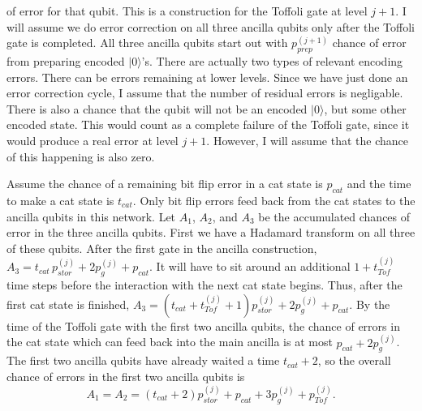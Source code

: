 \documentclass{report}
\newcommand{\ket}[1]{|{#1}\rangle}
\newcommand{\ptj}[1]{p_{Tof}^{({#1})}}
\newcommand{\pgj}[1]{p_g^{({#1})}}
\newcommand{\psj}[1]{p_{stor}^{({#1})}}
\newcommand{\ppj}[1]{p_{prep}^{({#1})}}
\newcommand{\ttj}[1]{t_{Tof}^{({#1})}}
\begin{document}
of error for that qubit.  This is a construction for the Toffoli gate at level 
$j+1$.  I will assume we do error correction on all three ancilla qubits only 
after the Toffoli gate is completed.  All three ancilla qubits start out with 
$\ppj{j+1}$ chance of error from preparing encoded $\ket{0}$'s.  There are 
actually two types of relevant encoding errors.  There can be errors 
remaining at lower levels.  Since we have just done an error correction 
cycle, I assume that the number of residual errors is negligable.  There is 
also a chance that the qubit will not be an encoded $\ket{0}$, but some 
other encoded state.  This would count as a complete failure of the Toffoli 
gate, since it would produce a real error at level $j+1$.  However, I will 
assume that the chance of this happening is also zero.

Assume the chance of a remaining bit flip error in a cat state is $p_{cat}$ 
and the time to make a cat state is $t_{cat}$.  Only bit flip errors feed back 
from the cat states to the ancilla qubits in this network.  Let $A_1$, $A_2$, 
and $A_3$ be the accumulated chances of error in the three ancilla qubits.
First we have a Hadamard transform on all three of these qubits.  After the 
first gate in the ancilla construction, $A_3 = t_{cat}\,\psj{j} + 2 \pgj{j} + p_{cat}$.  It will have to sit around an additional $1 + \ttj{j}$ 
time steps before the interaction with the next cat state begins.  Thus, after 
the first cat state is finished, $A_3 = (t_{cat} + \ttj{j} + 1) \psj{j} + 
2 \pgj{j} + p_{cat}$.  By the time of the Toffoli gate with the first two 
ancilla qubits, the chance of errors in the cat state which can feed back into 
the main ancilla is at most $p_{cat} + 2 \pgj{j}$.  The first two ancilla 
qubits have already waited a time $t_{cat}+2$, so the overall chance of errors 
in the first two ancilla qubits is 
\begin{equation}
A_1 = A_2 = (t_{cat}+2) \psj{j} + p_{cat} + 3 \pgj{j} + \ptj{j}.
\end{equation}
\end{document}
